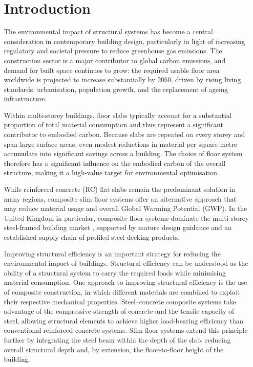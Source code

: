 \section{Introduction}
\label{firstchapter}

The environmental impact of structural systems has become a central consideration in contemporary building design, particularly in light of increasing regulatory and societal pressure to reduce greenhouse gas emissions. The construction sector is a major contributor to global carbon emissions, and demand for built space continues to grow: the required usable floor area worldwide is projected to increase substantially by 2060, driven by rising living standards, urbanisation, population growth, and the replacement of ageing infrastructure.

Within multi-storey buildings, floor slabs typically account for a substantial proportion of total material consumption and thus represent a significant contributor to embodied carbon. Because slabs are repeated on every storey and span large surface areas, even modest reductions in material per square metre accumulate into significant savings across a building. The choice of floor system therefore has a significant influence on the embodied carbon of the overall structure, making it a high-value target for environmental optimisation.

While reinforced concrete (RC) flat slabs remain the predominant solution in many regions, composite slim floor systems offer an alternative approach that may reduce material usage and overall Global Warming Potential (GWP). In the United Kingdom in particular, composite floor systems dominate the multi-storey steel-framed building market \citep{RefWorks:2011composite}, supported by mature design guidance and an established supply chain of profiled steel decking products.

Improving structural efficiency is an important strategy for reducing the environmental impact of buildings. Structural efficiency can be understood as the ability of a structural system to carry the required loads while minimising material consumption. One approach to improving structural efficiency is the use of composite construction, in which different materials are combined to exploit their respective mechanical properties. Steel--concrete composite systems take advantage of the compressive strength of concrete and the tensile capacity of steel, allowing structural elements to achieve higher load-bearing efficiency than conventional reinforced concrete systems. Slim floor systems extend this principle further by integrating the steel beam within the depth of the slab, reducing overall structural depth and, by extension, the floor-to-floor height of the building.

